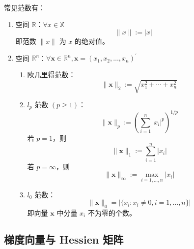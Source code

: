\documentclass[cn,mtpro2,12pt]{elegantbook}
\begin{document}
\begin{example}[常见范数]
    常见范数有：
    \begin{enumerate}
        \item 空间 $\mathbb{R}$：$\forall x\in\mathbb{X}$
              \begin{equation}
                  \|x\|:=|x|
              \end{equation}
              即范数 $\|x\|$ 为 $x$ 的绝对值。
        \item 空间 $\mathbb{R}^{n}$：$\forall\mathbf{x}\in\mathbb{R}^{n}, \mathbf{x}=(x_{1},x_{2},\ldots,x_{n})^{\prime}$
              \begin{enumerate}
                  \item 欧几里得范数：
                        \begin{equation}
                            \|\mathbf{x}\|_{2}:=\sqrt{x_{1}^{2}+\cdots+x_{n}^{2}}
                        \end{equation}
                  \item  $l_{p}$ 范数 $(p\geq 1)$：
                        \begin{equation}
                            \|\mathbf{x}\|_{p}:=\left(\sum_{i=1}^{n}\left|x_{i}\right|^{p}\right)^{1/p}
                        \end{equation}
                        若 $p=1$，则
                        \begin{equation}
                            \|\mathbf{x}\|_{1}:=\sum_{i=1}^{n}|x_{i}|
                        \end{equation}
                        若 $p=\infty$，则
                        \begin{equation}
                            \|\mathbf{x}\|_{\infty}:=\max_{i=1,\ldots,n}|x_{i}|
                        \end{equation}
                  \item  $l_{0}$ 范数：
                        \begin{equation}
                            \|\mathbf{x}\|_{0}=|\{x_{i}:x_{i}\neq 0,i=1,\ldots,n\}|
                        \end{equation}
                        即向量 $\mathbf{x}$ 中分量 $x_{i}$ 不为零的个数。
              \end{enumerate}
    \end{enumerate}
\end{example}

\subsection{梯度向量与 Hessien 矩阵}
\end{document}
